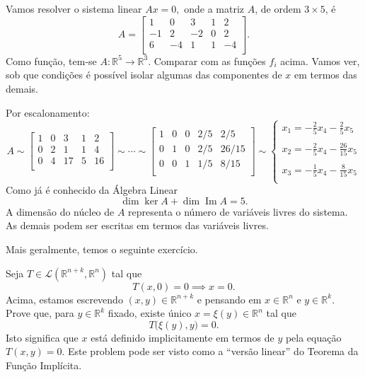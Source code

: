 \begin{ex}
	Vamos resolver o sistema linear $Ax = 0,$ onde a matriz $A$, de ordem $3 \times 5$, é
	\[
	A = \left[
	\begin{array}{ccccc}
	1  & 0  & 3   & 1 & 2 \\
	-1 & 2  & -2  & 0 & 2 \\
	6  & -4 & 1   & 1 & -4 \\
	\end{array}
	\right].
	\] Como função, tem-se $A: \mathbb{R}^5 \to \mathbb{R}^3$. Comparar com as funções $f_i$ acima. Vamos ver, sob que condições é possível isolar algumas das componentes de $x$ em termos das demais.
	
	Por escalonamento:
	\[
	A \sim \left[
	\begin{array}{ccccc}
	1  & 0  & 3   & 1 & 2  \\
	0  & 2  & 1   & 1 & 4  \\
	0  & 4  & 17  & 5 & 16 \\
	\end{array}
	\right] \sim \cdots \sim \left[
	\begin{array}{ccccc}
	1  & 0  & 0  & 2/5 & 2/5  \\
	0  & 1  & 0  & 2/5 & 26/15  \\
	0  & 0  & 1  & 1/5 & 8/15 \\
	\end{array}
	\right] \sim 
	\left\{
	\begin{array}{ll}
	x_1 = - \frac{2}{5} x_4 - \frac{2}{5} x_5  \\
	\\
	x_2 = - \frac{2}{5} x_4 - \frac{26}{15} x_5  \\
	\\
	x_3 = - \frac{1}{5} x_4 - \frac{8}{15} x_5  \\
	\end{array}
	\right.
	\] Como já é conhecido da Álgebra Linear
	\[
	\operatorname{dim} \ker A + \operatorname{dim} \operatorname{Im} A = 5.
	\] A dimensão do núcleo de $A$ representa o número de variáveis livres do sistema. As demais podem ser escritas em termos das variáveis livres.
\end{ex}

Mais geralmente, temos o seguinte exercício.

\begin{exer}\label{exerc:lintfi}
	Seja $T \in \mathcal{L}(\mathbb{R}^{n+k}, \mathbb{R}^n)$ tal que
	\begin{equation}
	T(x,0) = 0 \implies x = 0.
	\end{equation} Acima, estamos escrevendo $(x,y) \in \mathbb{R}^{n+k}$ e pensando em $x \in \mathbb{R}^n$ e $y \in \mathbb{R}^k$. Prove que, para $y \in \mathbb{R}^k$ fixado, existe único $x = \xi(y) \in \mathbb{R}^n$ tal que
	\[
	T\big(\xi(y),y\big) = 0.
	\] Isto significa que $x$ está definido implicitamente em termos de $y$ pela equação $T(x,y)=0$. Este problem pode ser visto como a ``versão linear'' do Teorema da Função Implícita.
\end{exer}


